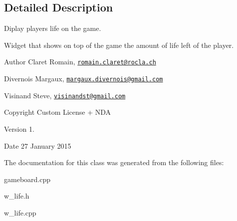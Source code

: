 \subsection{Detailed Description}
Diplay player\textquotesingle{}s life on the game. 

Widget that shows on top of the game the amount of life left of the player. \begin{DoxyAuthor}{Author}
Claret Romain, \href{mailto:romain.claret@rocla.ch}{\tt romain.\+claret@rocla.\+ch} 

Divernois Margaux, \href{mailto:margaux.divernois@gmail.com}{\tt margaux.\+divernois@gmail.\+com} 

Visinand Steve, \href{mailto:visinandst@gmail.com}{\tt visinandst@gmail.\+com} 
\end{DoxyAuthor}
\begin{DoxyCopyright}{Copyright}
Custom License + N\+D\+A 
\end{DoxyCopyright}
\begin{DoxyVersion}{Version}
1. 
\end{DoxyVersion}
\begin{DoxyDate}{Date}
27 January 2015 
\end{DoxyDate}


The documentation for this class was generated from the following files\+:\begin{DoxyCompactItemize}
\item 
gameboard.\+cpp\item 
w\+\_\+life.\+h\item 
w\+\_\+life.\+cpp\end{DoxyCompactItemize}
